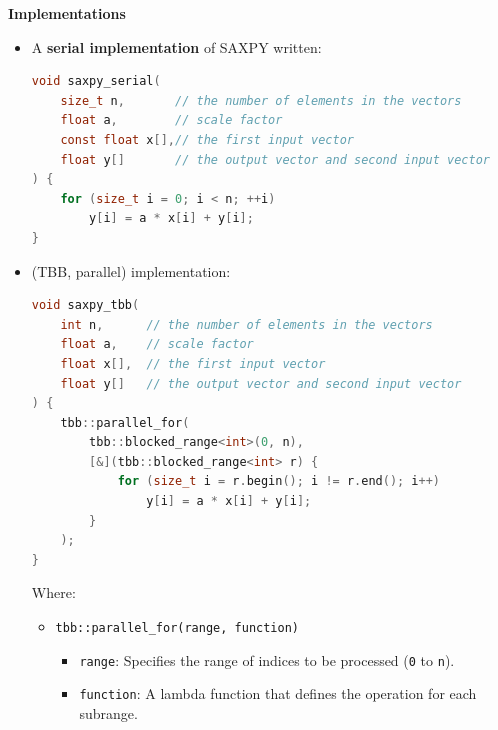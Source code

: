 \highspace
\begin{flushleft}
    \textcolor{Green3}{ \textbf{Implementations}}
\end{flushleft}
\begin{itemize}
    \item A \textbf{serial implementation} of SAXPY written:
    \begin{lstlisting}[language=c]
void saxpy_serial(
    size_t n,       // the number of elements in the vectors
    float a,        // scale factor
    const float x[],// the first input vector
    float y[]       // the output vector and second input vector
) {
    for (size_t i = 0; i < n; ++i)
        y[i] = a * x[i] + y[i];
}\end{lstlisting}

    \newpage
    \item {} (TBB, parallel) implementation:
    \begin{lstlisting}[language=c]
void saxpy_tbb(
    int n,      // the number of elements in the vectors
    float a,    // scale factor
    float x[],  // the first input vector
    float y[]   // the output vector and second input vector
) {
    tbb::parallel_for(
        tbb::blocked_range<int>(0, n),
        [&](tbb::blocked_range<int> r) {
            for (size_t i = r.begin(); i != r.end(); i++)
                y[i] = a * x[i] + y[i];
        }
    );
}\end{lstlisting}
    Where:
    \begin{itemize}
        \item \texttt{tbb::parallel\_for(range, function)}
        \begin{itemize}
            \item \texttt{range}: Specifies the range of indices to be processed (\texttt{0} to \texttt{n}).
            \item \texttt{function}: A lambda function that defines the operation for each subrange.
        \end{itemize}
        

\end{itemize}
\end{itemize}
